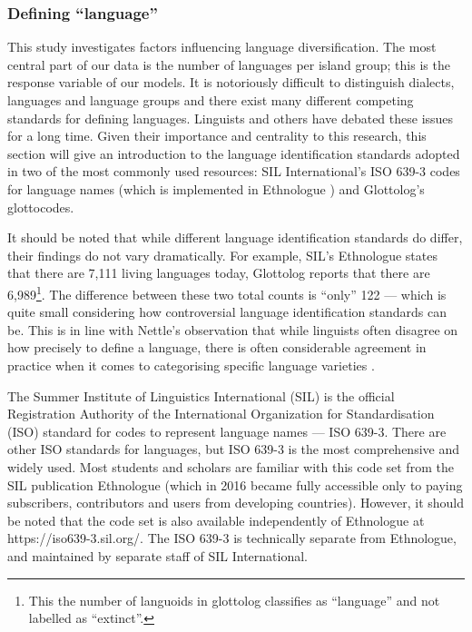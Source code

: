 \documentclass[a4paper,10pt]{article} %
\begin{document}


\subsubsection{Defining ``language''}
\label{sec:language_class}
This study investigates factors influencing language diversification. The most central part of our data is the number of languages per island group; this is the response variable of our models. It is notoriously difficult to distinguish dialects, languages and language groups and there exist many different competing standards for defining languages. Linguists and others have debated these issues for a long time. Given their importance and centrality to this research, this section will give an introduction to the language identification standards adopted in two of the most commonly used resources: SIL International's ISO 639-3 codes for language names (which is implemented in Ethnologue \citep{ethnologue22}) and Glottolog's glottocodes.

It should be noted that while different language identification standards do differ, their findings do not vary dramatically. For example, SIL's Ethnologue states that there are 7,111 living languages today, Glottolog reports that there are 6,989\footnote{This the number of languoids in glottolog classifies as ``language'' and not labelled as ``extinct''.}. The difference between these two total counts is ``only'' 122 --- which is quite small considering how controversial language identification standards can be. This is in line with Nettle's observation that while linguists often disagree on how precisely to define a language, there is often considerable agreement in practice when it comes to categorising specific language varieties \citep[356]{NETTLE1998}.

The Summer Institute of Linguistics International (SIL) is the official Registration Authority of the International Organization for Standardisation (ISO) standard for codes to represent language names --- ISO 639-3. There are other ISO standards for languages, but ISO 639-3 is the most comprehensive and widely used. Most students and scholars are familiar with this code set from the SIL publication Ethnologue (which in 2016 became fully accessible only to paying subscribers, contributors and users from developing countries). However, it should be noted that the code set is also available independently of Ethnologue at https://iso639-3.sil.org/. The ISO 639-3 is technically separate from Ethnologue, and maintained by separate staff of SIL International.
\end{document}
